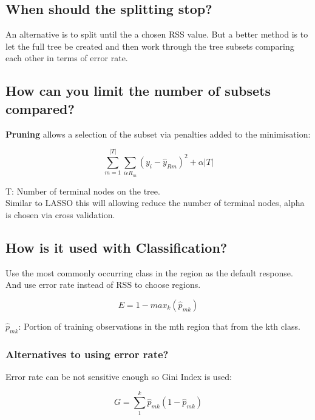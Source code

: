 \documentclass[11pt]{scrartcl} %
\begin{document}
\subsection{When should the splitting stop?}

An alternative is to split until the a chosen RSS value. But a better method is to let the full 
tree be created and then work through the tree subsets comparing each other in terms of error rate.

\subsection{How can you limit the number of subsets compared?}

\textbf{Pruning} allows a selection of the subset via penalties added to the minimisation:

\begin{equation}
	\sum^{|T|}_{m=1}\sum_{i\epsilon R_m}{(y_i-\hat{y}_{Rm})}^2 + \alpha|T| 
\end{equation}

T: Number of terminal nodes on the tree.\\

Similar to LASSO this will allowing reduce the number of terminal nodes, alpha is chosen via cross
validation.

\subsection{How is it used with Classification?}

Use the most commonly occurring class in the region as the default response. And use error rate
instead of RSS to choose regions.

\begin{equation}
	E = 1-max_k(\hat{p}_{mk})
\end{equation}

\(\hat{p}_{mk}\): Portion of training observations in the mth region that from the kth class.

\subsubsection{Alternatives to using error rate?}

Error rate can be not sensitive enough so Gini Index is used:

\begin{equation}
	G = \sum^k_1{\hat{p}_{mk}(1-\hat{p}_{mk})}
\end{equation}
\end{document}
